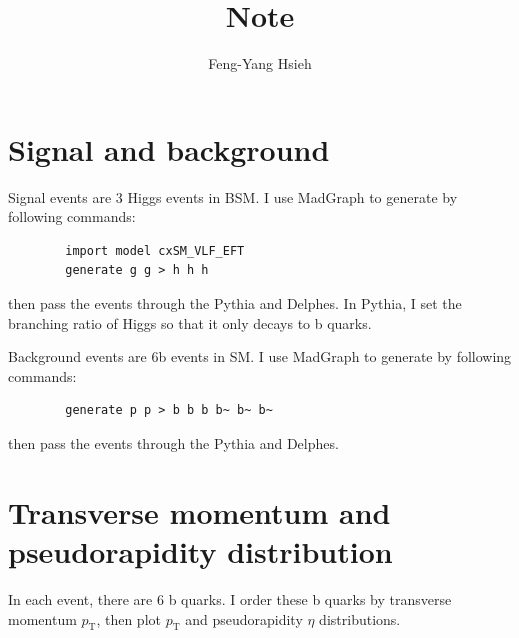 \documentclass[12pt]{article}
\title{Note}
\author{Feng-Yang Hsieh}
\date{}
\begin{document}
\maketitle
\section{Signal and background}%
\label{sec:signal_and_background}
	Signal events are 3 Higgs events in BSM. I use MadGraph to generate by following commands:
	\begin{verbatim}
		import model cxSM_VLF_EFT
		generate g g > h h h
	\end{verbatim}
	then pass the events through the Pythia and Delphes. In Pythia, I set the branching ratio of Higgs so that it only decays to b quarks.

	Background events are 6b events in SM. I use MadGraph to generate by following commands:
	\begin{verbatim}
		generate p p > b b b b~ b~ b~
	\end{verbatim}
	then pass the events through the Pythia and Delphes.

\section{Transverse momentum and pseudorapidity distribution}%
\label{sec:transverse_momentum_and_pseudorapidity_distribution}
	In each event, there are 6 b quarks. I order these b quarks by transverse momentum $p_\text{T}$, then plot $p_\text{T} $ and pseudorapidity $\eta$ distributions.
\end{document}
